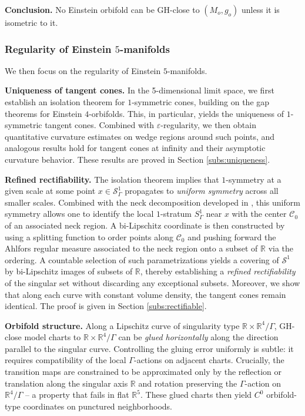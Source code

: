 \documentclass[11pt,reqno]{amsart}
\numberwithin{equation}{section}
\newcommand{\RR}{\mathds{R}}
\newcommand{\cC}{\mathcal{C}}
\newcommand{\cS}{\mathcal{S}}
\theoremstyle{definition}
\theoremstyle{remark}
\begin{document}
\noindent\textbf{Conclusion.} No Einstein orbifold can be GH-close to $(M_o,g_o)$ unless it is isometric to it.



\subsubsection{Regularity of Einstein $5$-manifolds}

We then focus on the regularity of Einstein $5$-manifolds. 

\noindent\textbf{Uniqueness of tangent cones.}
In the 5-dimensional limit space, we first establish an isolation theorem for $1$-symmetric cones, building on the gap theorems for Einstein $4$-orbifolds.  
This, in particular, yields the uniqueness of $1$-symmetric tangent cones.  
Combined with $\varepsilon$-regularity, we then obtain quantitative curvature estimates on wedge regions around such points, and analogous results hold for tangent cones at infinity and their asymptotic curvature behavior. These results are proved in Section \ref{subs:uniqueness}.

\noindent \textbf{Refined rectifiability.} 
The isolation theorem implies that $1$-symmetry at a given scale at some point $x\in \cS^1_{\Gamma}$ propagates to \emph{uniform symmetry} across all smaller scales.  
Combined with the neck decomposition developed in \cite{jn,cjn}, this uniform symmetry allows one to identify the local $1$-stratum $S^1_{\Gamma}$ near $x$ with the center $\cC_0$ of an associated neck region. A bi-Lipschitz coordinate is then constructed by using a splitting function to order points along 
$\cC_0$ and pushing forward the Ahlfors regular measure associated to the neck region onto a subset of $\RR$ via the ordering.   
A countable selection of such parametrizations yields a covering of $\cS^1$ by bi-Lipschitz images of subsets of $\mathbb{R}$, thereby establishing a \emph{refined rectifiability} of the singular set without discarding any exceptional subsets.  
Moreover, we show that along each curve with constant volume density, the tangent cones remain identical. The proof is given in Section \ref{subs:rectifiable}.


\noindent \textbf{Orbifold structure.}
Along a Lipschitz curve of singularity type $\RR \times \RR^4/\Gamma$, GH-close model charts to $\mathbb{R}\times \mathbb{R}^4/\Gamma$ can be \emph{glued horizontally} along the direction parallel to the singular curve. Controlling the gluing error uniformly is subtle: it requires compatibility of the local $\Gamma$-actions on adjacent charts. Crucially, the transition maps are constrained to be approximated only by the reflection or translation along the singular axis $\RR$ and rotation preserving the $\Gamma$-action on $\RR^4/\Gamma$ -- a property that fails in flat $\RR^5$. These glued charts then yield $C^0$ orbifold-type coordinates on punctured neighborhoods. 
\end{document}
